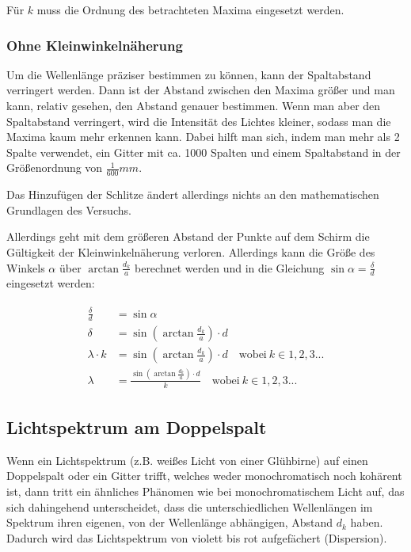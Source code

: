 \noindent Für $k$ muss die Ordnung des betrachteten Maxima eingesetzt werden.
		

\subsubsection{Ohne Kleinwinkelnäherung}

Um die Wellenlänge präziser bestimmen zu können, kann der Spaltabstand verringert werden. Dann ist der Abstand zwischen den Maxima größer und man kann, relativ gesehen, den Abstand genauer bestimmen. Wenn man aber den Spaltabstand verringert, wird die Intensität des Lichtes kleiner, sodass man die Maxima kaum mehr erkennen kann. Dabei hilft man sich, indem man mehr als 2 Spalte verwendet, ein Gitter mit ca. 1000 Spalten und einem Spaltabstand in der Größenordnung von $\frac{1}{600}mm$.

Das Hinzufügen der Schlitze ändert allerdings nichts an den mathematischen Grundlagen des Versuchs.
	
Allerdings geht mit dem größeren Abstand der Punkte auf dem Schirm die Gültigkeit der Kleinwinkelnäherung verloren. Allerdings kann die Größe des Winkels $\alpha$ über $\arctan{\frac{d_k}{a}}$ berechnet werden und in die Gleichung $\sin{\alpha} = \frac{\delta}{d}$ eingesetzt werden:
	
\begin{align}
\begin{split}
		\frac{\delta}{d} &= \sin{\alpha} \\
		\delta &= \sin{(\arctan{\frac{d_k}{a}})} \cdot d \\
		\lambda \cdot k &= \sin{(\arctan{\frac{d_k}{a}})} \cdot d   \quad \text{wobei} \ k \in 1,2,3... \\
		\lambda &= \frac{\sin{(\arctan{\frac{d_k}{a}})} \cdot d}{k} \quad \text{wobei} \ k \in 1,2,3...
\end{split}
\end{align}


\subsection{Lichtspektrum am Doppelspalt}

Wenn ein Lichtspektrum (z.B. weißes Licht von einer Glühbirne) auf einen Doppelspalt oder ein Gitter trifft, welches weder monochromatisch noch kohärent ist, dann tritt ein ähnliches Phänomen wie bei monochromatischem Licht auf, das sich dahingehend unterscheidet, dass die unterschiedlichen Wellenlängen im Spektrum ihren eigenen, von der Wellenlänge abhängigen, Abstand $d_k$ haben. Dadurch wird das Lichtspektrum von violett bis rot aufgefächert (\glqq Dispersion\grqq ).


